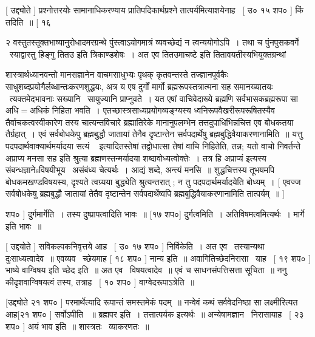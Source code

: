 \documentclass[11pt, openany]{book}
\begin{document}
 [ उद्द्योते ] प्रश्नोत्तरयोः सामानाधिकरण्याय प्रातिपदिकार्थप्रश्ने
तात्पर्यमित्याशयेनाह \textendash\ [ उ० १५ शप० ] किं तदिति~॥ [ १६



२ {\qt वस्तुतस्तूक्तभाष्यानुरोधादमरग्रन्थे} पुंस्त्वाऽयोगमात्रं व्यवच्छेद्यं
न त्वन्ययोगोऽपि~। तथा च पुंनपुसकवर्गे \textendash\ {\qt स्याद्वास्तु हिङ्गु तितउ} इति
त्रिकाण्डशेषः~। अत एव तितउमाचष्टे इति तितावयतीस्यभियुक्तग्रन्थां 





शास्त्रार्थध्यानवन्तो मानसज्ञानेन वाचमसाधुभ्यः पृथक् कृतवन्तस्ते
तज्ज्ञानपूर्वकैः साधुशब्दप्रयोगैर्लब्धान्तःकरणशुद्धयः, अत्र य एष दुर्गों
मार्गो ब्रह्मरूपस्तत्रात्मना सह समानख्यातयः \textendash\ त्यक्तमेदभावनाः
सख्यानि \textendash\ सायुज्यानि प्राप्नुवते~। यत एषां वाचिवेदाख्ये ब्रह्मणि
सर्वभासकब्रह्मरूपा सा अधि$=$अधिकं निहिता भवति~। 
एतच्छास्त्रसाध्यप्रयोगव्यङ्ग्यस्य ध्वनिरूपवैखरीरूपरूषितस्यैव
तैर्वाचकत्वस्वीकारेण तस्य चात्यन्तविचारे ब्रह्मातिरेके मानानुपलम्भेन
तत्तदुपाधिभिन्नचित्त एव बोधकतया तैर्ग्रहात्~। एवं सर्वबोधकेपु
ब्रह्मबुद्धौ जातायां तेनैव दृष्टान्तेन सर्वपदार्थेषु
ब्रह्मबुद्धिवैयाकरणानामिति~॥ यत्तु पदपदार्थवाक्यार्थमर्यादया
{\qt सत्यं \textendash\ } इत्यादितस्तेषां तद्वोधात्सा तेषां वाचि निहितेति, तन्न; {\qt यतो
वाचो निवर्तन्ते अप्राप्य मनसा सह} इति श्रुत्या ब्रह्मणस्तन्मर्यादया
शब्दावोध्यत्वोक्तेः~। तत्र हि अप्राप्यं इत्यस्य
संबन्धज्ञानेsविषयीभूय \textendash\ असंबंध्य चेत्यर्थः~। आद्यं शब्दे, अन्त्यं मनसि~॥
शुद्धचित्तस्य तूभयमपि बोधकमखण्डविषयस्य, दृश्यते त्वग्र्यया
बुद्ध्येति श्रुत्यन्तरात् ; न तु पदपदार्थमर्यादयेति बोध्यम्~। [
एवज्ज सर्वबोधकेषु ब्रह्मबुद्धौ जातायां तेतैव दृष्टान्तेन
सर्वपदार्थेष्वपि ब्रह्मबुद्धिवैयाकरणानामिति तात्पर्यम्~॥ ] 



 शप० ] दुर्गमार्गेति~। तस्य दुष्प्रापत्वादिति भावः~॥ [१७ शप०]
दुर्गत्वमिति~। अतिविषमत्वमित्यर्थः~। मार्गे इति भावः~॥ 

 [ उद्दयोते ] सविकल्पकनिवृत्तये आह \textendash\ [ उ० १७ शप० ] निर्विकेति~। 
अत एव \textendash\ तस्यान्यथा दुःसाध्यत्वादेव~॥ एवव्यव \textendash\ च्छेयमाह [ १८ शप० ]
नान्य इति~॥ अवागितिच्छेदनिरासा \textendash\ याह \textendash\ [ १९ शप० ] भाष्ये वाग्विषय
इति च्छेद इति~॥ अत एव \textendash\ विषयत्वादेव~॥ एवं च साधनसंपत्तिसत्ता सूचिता~॥
ननु कीदृशवाग्विषयत्वं तस्य, तत्राह \textendash\ [ १० शप० ] वाग्वेदरूपाऽत्रेति~॥


 [उद्द्योते २१ शप० ] परमार्थेत्यादि रूपान्तं समस्तमेकं पदम्~॥
नन्वेवं कथं सर्ववेदनिष्ठा सा लक्ष्मीरित्यत आह[२१ शप० ] सर्वोऽपीति
~॥ ब्रह्मपर इति~। तत्तात्पर्यक इत्यर्थः~॥ अन्येषामज्ञान \textendash\ 
निरासायाह \textendash\ [ २३ शप० ] अयं भाव इति~॥ शास्त्रतः \textendash\ व्याकरणतः~॥ 
\end{document}

